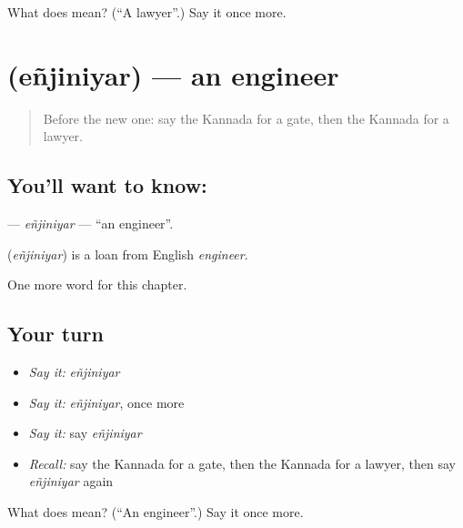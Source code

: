 \begin{tcolorbox}[breakable,colback=teal!4,colframe=teal!35!black,title={Before you move on}]
What does  mean? (\textquotedblleft{}A lawyer\textquotedblright{}.) Say it once more.
\end{tcolorbox}
\section[\texorpdfstring{\kn{ಎಂಜಿನಿಯರ್} (eñjiniyar)}{ಎಂಜಿನಿಯರ್ (eñjiniyar)}]{ (eñjiniyar) — an engineer}

\label{lesson:KA-C268-enjiniyar}



\begin{quote}
Before the new one: say the Kannada for a gate, then the Kannada for a lawyer.
\end{quote}

\subsection*{You'll want to know: }
\textbf{} — \emph{eñjiniyar} — \textquotedblleft{}an engineer\textquotedblright{}.

\begin{cousinweb}
\textbf{} (\emph{eñjiniyar}) is a loan from English \emph{engineer}.
\end{cousinweb}

\begin{grammarlens}[title={What you've built}]
One more word for this chapter.
\end{grammarlens}

\subsection*{Your turn}
\begin{itemize}
\raggedright
  \item \emph{Say it:} \emph{eñjiniyar}
  \item \emph{Say it:} \emph{eñjiniyar}, once more
  \item \emph{Say it:} say \emph{eñjiniyar}
  \item \emph{Recall:} say the Kannada for a gate, then the Kannada for a lawyer, then say \emph{eñjiniyar} again
\end{itemize}

\begin{tcolorbox}[breakable,colback=teal!4,colframe=teal!35!black,title={Before you move on}]
What does  mean? (\textquotedblleft{}An engineer\textquotedblright{}.) Say it once more.
\end{tcolorbox}
